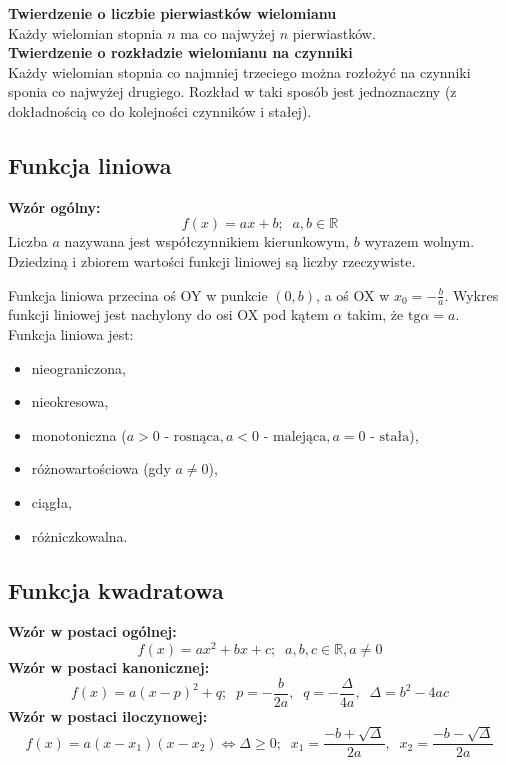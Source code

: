 \documentclass[14pt,a4paper]{extarticle}
\begin{document}
\smallskip
\noindent\textbf{Twierdzenie o liczbie pierwiastków wielomianu}\\
Każdy wielomian stopnia $n$ ma co najwyżej $n$ pierwiastków.\\

\smallskip
\noindent\textbf{Twierdzenie o rozkładzie wielomianu na czynniki}\\
Każdy wielomian stopnia co najmniej trzeciego można rozłożyć na czynniki sponia co najwyżej drugiego.
Rozkład w taki sposób jest jednoznaczny (z dokładnością co do kolejności czynników i stałej).\\

\subsection{Funkcja liniowa}
\noindent\textbf{Wzór ogólny:}
$$f(x) = ax + b;\;\; a, b \in \mathbb{R}$$
Liczba $a$ nazywana jest współczynnikiem kierunkowym, $b$ wyrazem wolnym. Dziedziną i zbiorem wartości
funkcji liniowej są liczby rzeczywiste.\hfill\break
\vspace{1pt}

\noindent Funkcja liniowa przecina oś OY w punkcie $(0, b)$, a oś OX w $x_{0} = -\frac{b}{a}$. Wykres funkcji liniowej 
jest nachylony do osi OX pod kątem $\alpha$ takim, że $\text{tg}\alpha = a$.\\

\noindent Funkcja liniowa jest:
\begin{itemize}
   \item nieograniczona,
   \item nieokresowa,
   \item monotoniczna ($a > 0 \text{ - rosnąca}, a < 0 \text{ - malejąca}, a = 0 \text{ - stała}$),
   \item różnowartościowa (gdy $a \neq 0$),
   \item ciągła,
   \item różniczkowalna.
\end{itemize}

\subsection{Funkcja kwadratowa}
\noindent\textbf{Wzór w postaci ogólnej:}
$$f(x) = ax^{2} + bx + c;\;\; a, b, c \in \mathbb{R}, a \neq 0$$
\noindent\textbf{Wzór w postaci kanonicznej:}
$$f(x) = a(x - p)^{2} + q;\;\; p = -\frac{b}{2a},\;\; q = -\frac{\Delta}{4a}, \;\; \Delta = b^{2} -4ac$$
\noindent\textbf{Wzór w postaci iloczynowej:}
$$f(x) = a(x - x_{1})(x - x_{2}) \Leftrightarrow \Delta \geq 0; \;\; x_{1} = \frac{-b + \sqrt{\Delta}}{2a},\;\; x_{2} = \frac{-b - \sqrt{\Delta}}{2a}$$
\end{document}
